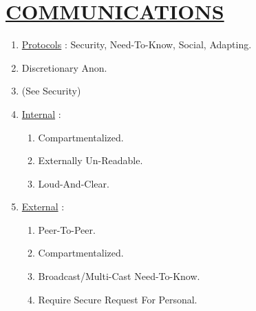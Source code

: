 \documentclass[11pt]{article}
\begin{document}
\section*{\ul{COMMUNICATIONS}}
\begin{enumerate}
	\item[] \ul{Protocols} : Security, Need-To-Know, Social, Adapting.
	
	\item[] Discretionary Anon.
	\item[] (See Security)
	
	\item[] \ul{Internal} :
	\begin{enumerate}
		\item[] Compartmentalized.
		\item[] Externally Un-Readable.
		\item[] Loud-And-Clear.
	\end{enumerate}

	\item[] \ul{External} :
	\begin{enumerate}
		\item[] Peer-To-Peer.
		\item[] Compartmentalized.
		\item[] Broadcast/Multi-Cast Need-To-Know.
		\item[] Require Secure Request For Personal.
	\end{enumerate}

\end{enumerate}
\end{document}
